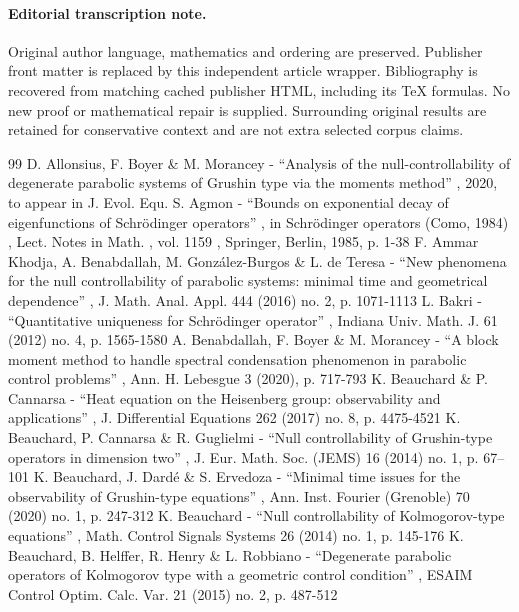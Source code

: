 \documentclass[11pt]{article}
\numberwithin{equation}{section}
\begin{document}
\paragraph{Editorial transcription note.}
Original author language, mathematics and ordering are preserved. Publisher front matter is replaced by this independent article wrapper. Bibliography is recovered from matching cached publisher HTML, including its TeX formulas. No new proof or mathematical repair is supplied. Surrounding original results are retained for conservative context and are not extra selected corpus claims.
\clearpage

\begin{thebibliography}{99}
 D. Allonsius, F. Boyer \& M. Morancey - “Analysis of the null-controllability of degenerate parabolic systems of Grushin type via the moments method” , 2020, to appear in J. Evol. Equ.
 S. Agmon - “Bounds on exponential decay of eigenfunctions of Schrödinger operators” , in Schrödinger operators (Como, 1984) , Lect. Notes in Math. , vol. 1159 , Springer, Berlin, 1985, p. 1-38
 F. Ammar Khodja, A. Benabdallah, M. González-Burgos \& L. de Teresa - “New phenomena for the null controllability of parabolic systems: minimal time and geometrical dependence” , J. Math. Anal. Appl. 444 (2016) no. 2, p. 1071-1113
 L. Bakri - “Quantitative uniqueness for Schrödinger operator” , Indiana Univ. Math. J. 61 (2012) no. 4, p. 1565-1580
 A. Benabdallah, F. Boyer \& M. Morancey - “A block moment method to handle spectral condensation phenomenon in parabolic control problems” , Ann. H. Lebesgue 3 (2020), p. 717-793
 K. Beauchard \& P. Cannarsa - “Heat equation on the Heisenberg group: observability and applications” , J. Differential Equations 262 (2017) no. 8, p. 4475-4521
 K. Beauchard, P. Cannarsa \& R. Guglielmi - “Null controllability of Grushin-type operators in dimension two” , J. Eur. Math. Soc. (JEMS) 16 (2014) no. 1, p. 67–101
 K. Beauchard, J. Dardé \& S. Ervedoza - “Minimal time issues for the observability of Grushin-type equations” , Ann. Inst. Fourier (Grenoble) 70 (2020) no. 1, p. 247-312
 K. Beauchard - “Null controllability of Kolmogorov-type equations” , Math. Control Signals Systems 26 (2014) no. 1, p. 145-176
 K. Beauchard, B. Helffer, R. Henry \& L. Robbiano - “Degenerate parabolic operators of Kolmogorov type with a geometric control condition” , ESAIM Control Optim. Calc. Var. 21 (2015) no. 2, p. 487-512

\end{thebibliography}
\end{document}
